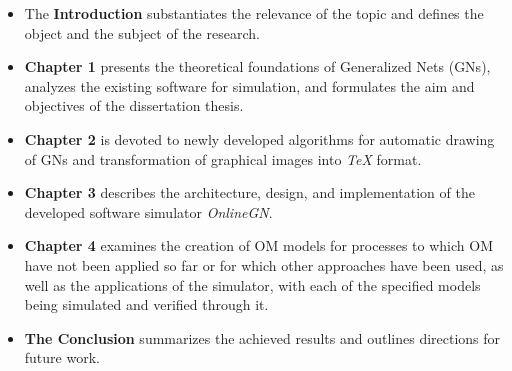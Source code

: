 \begin{flushleft}
	\begin{itemize}
		\item The \textbf{Introduction} substantiates the relevance of the topic and defines the object and the subject of the research.
		\item \textbf{Chapter 1} presents the theoretical foundations of Generalized Nets (GNs), analyzes the existing software for simulation, and formulates the aim and objectives of the dissertation thesis.
		\item \textbf{Chapter 2} is devoted to newly developed algorithms for automatic drawing of GNs and transformation of graphical images into \textit{TeX} format.
		\item \textbf{Chapter 3} describes the architecture, design, and implementation of the developed software simulator \textit{OnlineGN}.
		\item \textbf{Chapter 4} examines the creation of OM models for processes to which OM have not been applied so far or for which other approaches have been used, as well as the applications of the simulator, with each of the specified models being simulated and verified through it.
		\item \textbf{The Conclusion} summarizes the achieved results and outlines directions for future work.
	\end{itemize}
	
\end{flushleft}

\newpage


\newpage
{}
\pagestyle{fancy}
\fancyhf{}
\fancyfoot[R]{\thepage}
\setcounter{page}{2}
\renewcommand{\contentsname}{\Large Contents\vspace*{-0.5cm}}

\newpage
\tableofcontents